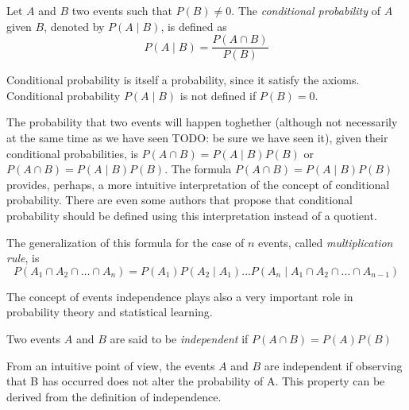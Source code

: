 \begin{definition}
Let $A$ and $B$ two events such that $P \left( B \right) \neq 0$. The \emph{conditional probability} of $A$ given $B$, denoted by $P \left( A \mid B \right)$, is defined as
\[
P\left(A\mid B\right) = \frac{P\left(A\cap B\right)}{P\left(B\right)}
\]
\end{definition}

Conditional probability is itself a probability, since it satisfy the axioms. Conditional probability $P\left(A\mid B\right)$ is not defined if $P\left(B\right)=0$.

The probability that two events will happen toghether (although not necessarily at the same time as we have seen {\color{red} TODO: be sure we have seen it}), given their conditional probabilities, is $P \left( A \cap B \right) = P \left( A \mid B \right) P \left( B \right)$ or $P \left( A \cap B \right) = P \left( A \mid B \right) P \left( B \right)$. The formula $P \left( A \cap B \right) = P \left( A \mid B \right) P \left( B \right)$ provides, perhaps, a more intuitive interpretation of the concept of conditional probability. There are even some authors that propose that conditional probability should be defined using this interpretation instead of a quotient.

The generalization of this formula for the case of $n$ events, called \emph{multiplication rule}, is
\[
P \left( A_{1} \cap A_{2} \cap \ldots \cap A_{n} \right) = P \left( A_{1} \right) P \left( A_{2} \mid A_{1}\right) \ldots  P \left( A_{n} \mid A_{1}\cap A_{2} \cap \ldots \cap A_{n-1} \right)
\]

The concept of events independence plays also a very important role in probability theory and statistical learning. 

\begin{definition}\label{independent_events}
Two events $A$ and $B$ are said to be \emph{independent} if $P \left( A \cap B \right) = P \left( A \right) P \left(B \right)$
\end{definition}

From an intuitive point of view, the events $A$ and $B$ are independent if observing that B has occurred does not alter the probability of A. This property can be derived from the definition of independence.

